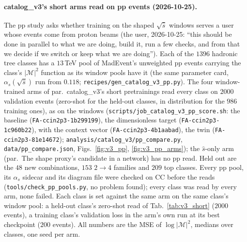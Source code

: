 \documentclass[11pt]{article}
\newcommand{\code}[1]{\texttt{#1}}
\begin{document}
\paragraph{catalog\_v3's short arms read on pp events (2026-10-25).} The pp study asks whether training on the shaped
$\sqrt{\hat s}$ windows serves a user whose events come from proton beams (the user, 2026-10-25: ``this should be done
in parallel to what we are doing, build it, run a few checks, and from that we decide if we switch or keep what we are
doing''). Each of the $1396$ hadronic tree classes has a $13$\,TeV pool of MadEvent's unweighted pp events carrying the
class's $|\mathcal M|^2$ function as its window pools have it (the same parameter card, $\alpha_s(\sqrt{\hat s})$ run
from $0.118$; \code{recipes/gen\_catalog\_v3\_pp.py}). The four window-trained arms of par.\ catalog\_v3's short
pretrainings read every class on $2000$ validation events (zero-shot for the held-out classes, in distribution for
the $986$ training ones), as on the windows (\code{scripts/job\_catalog\_v3\_pp\_score.sh}: the baseline
(\code{FA-ccin2p3-1b299199}), the dimensionless target (\code{FA-ccin2p3-1c960b22}), with the context vector
(\code{FA-ccin2p3-4b1aabad}), the twin (\code{FA-ccin2p3-81e14672}); \code{analysis/catalog\_v3/pp\_compare.py},
\code{data/pp\_compare.json}, Figs.~\ref{fig:v3_pp}, \ref{fig:v3_pp_arms}); the $\hat s$-only arm (par.\ The shape
proxy's candidate in a network) has no pp read. Held out are the $48$ new combinations, $153$ $2\to4$ families and
$209$ top classes. Every pp pool, its $\alpha_s$ sidecar and its diagram file were checked on CC before the reads
(\code{tools/check\_pp\_pools.py}, no problem found); every class was read by every arm, none failed. Each class is set against the same arm on the same class's window pool: a
held-out class's zero-shot read of Tab.~\ref{tab:v3_short} ($2000$ events), a training class's validation loss in the
arm's own run at its best checkpoint ($200$ events). All numbers are the MSE of $\log|\mathcal M|^2$, medians over
classes, one seed per arm.
\end{document}
